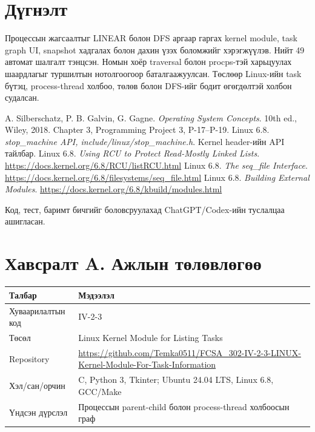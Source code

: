 \section{Дүгнэлт}
Процессын жагсаалтыг LINEAR болон DFS аргаар гаргах kernel module, task graph UI, snapshot хадгалах болон дахин үзэх боломжийг хэрэгжүүлэв. Нийт 49 автомат шалгалт тэнцсэн. Номын хоёр traversal болон procps-тэй харьцуулах шаардлагыг туршилтын нотолгоогоор баталгаажуулсан. Төслөөр Linux-ийн task бүтэц, process-thread холбоо, төлөв болон DFS-ийг бодит өгөгдөлтэй холбон судалсан.

\renewcommand{\refname}{Ашигласан материал}
\begin{thebibliography}{9}
\def\UrlFont{\ttfamily\scriptsize}
\small
{} A. Silberschatz, P. B. Galvin, G. Gagne. \textit{Operating System Concepts}. 10th ed., Wiley, 2018. Chapter 3, Programming Project 3, P-17--P-19.
 Linux 6.8. \textit{stop\_machine API, include/linux/stop\_machine.h}. Kernel header-ийн API тайлбар.
 Linux 6.8. \textit{Using RCU to Protect Read-Mostly Linked Lists}. \url{https://docs.kernel.org/6.8/RCU/listRCU.html}
 Linux 6.8. \textit{The seq\_file Interface}. \url{https://docs.kernel.org/6.8/filesystems/seq_file.html}
 Linux 6.8. \textit{Building External Modules}. \url{https://docs.kernel.org/6.8/kbuild/modules.html}
\end{thebibliography}
\noindent\footnotesize Код, тест, баримт бичгийг боловсруулахад ChatGPT/Codex-ийн туслалцаа ашигласан.

\clearpage
\normalsize
\section*{Хавсралт A. Ажлын төлөвлөгөө}
\begingroup
\small
\def\UrlFont{\ttfamily\scriptsize}
\renewcommand{\arraystretch}{1.2}
\setlength{\extrarowheight}{0pt}
\setlength{\tabcolsep}{5pt}

\noindent
\begin{tabularx}{\textwidth}{|P{3.6cm}|Y|}\hline
{}\textbf{Талбар} & \textbf{Мэдээлэл} \\\hline
Хуваарилалтын код & IV-2-3 \\\hline
Төсөл & Linux Kernel Module for Listing Tasks \\\hline
Repository & \url{https://github.com/Temka0511/FCSA_302-IV-2-3-LINUX-Kernel-Module-For-Task-Information} \\\hline
Хэл/сан/орчин & C, Python 3, Tkinter; Ubuntu 24.04 LTS, Linux 6.8, GCC/Make \\\hline
Үндсэн дүрслэл & Процессын parent-child болон process-thread холбоосын граф \\\hline
\end{tabularx}

